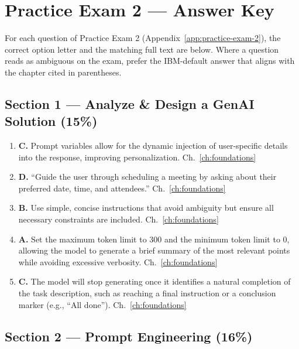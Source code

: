 \chapter{Practice Exam 2 --- Answer Key}
\label{app:practice-exam-2-answers}

For each question of Practice Exam 2 (Appendix~\ref{app:practice-exam-2}),
the correct option letter and the matching full text are below.
Where a question reads as ambiguous on the exam, prefer the IBM-default
answer that aligns with the chapter cited in parentheses.

\section*{Section 1 --- Analyze \& Design a GenAI Solution (15\%)}

\begin{enumerate}[leftmargin=*]
  \item \textbf{C.} Prompt variables allow for the dynamic injection of user-specific details into the response, improving personalization. \hfill Ch.~\ref{ch:foundations}
  \item \textbf{D.} ``Guide the user through scheduling a meeting by asking about their preferred date, time, and attendees.'' \hfill Ch.~\ref{ch:foundations}
  \item \textbf{B.} Use simple, concise instructions that avoid ambiguity but ensure all necessary constraints are included. \hfill Ch.~\ref{ch:foundations}
  \item \textbf{A.} Set the maximum token limit to 300 and the minimum token limit to 0, allowing the model to generate a brief summary of the most relevant points while avoiding excessive verbosity. \hfill Ch.~\ref{ch:foundations}
  \item \textbf{C.} The model will stop generating once it identifies a natural completion of the task description, such as reaching a final instruction or a conclusion marker (e.g., ``All done''). \hfill Ch.~\ref{ch:foundations}
\end{enumerate}

\section*{Section 2 --- Prompt Engineering (16\%)}

